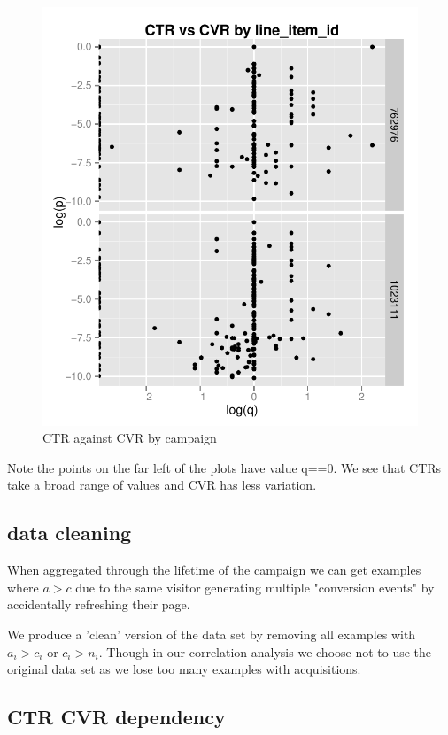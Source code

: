 \documentclass[11pt,a4,singlespacing,titlepagenumber=on]{scrreprt}
\numberwithin{equation}{chapter} %
\theoremstyle{remark}
\begin{document}
\begin{figure}[p]
    \centering
    \includegraphics{CTRvsCVR}
    \caption{CTR against CVR by campaign}
    \label{fig:CTRvsCVR}
\end{figure}


Note the points on the far left of the plots have value q==0.  We see that CTRs take a broad range of values and CVR has less variation. 

\subsection{data cleaning}

When aggregated through the lifetime of the campaign we can get examples where $a>c$ due to the same visitor generating multiple "conversion events" by accidentally refreshing their page.

We produce a 'clean' version of the data set by removing all examples with $a_i > c_i$ or $c_i > n_i$. Though in our correlation analysis we choose not to use the original data set as we lose too many examples with acquisitions.

\subsection{CTR CVR dependency}
\end{document}
